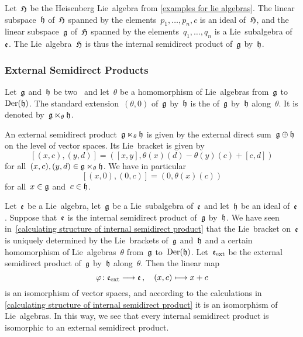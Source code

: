 

\begin{example}
	Let~$\mathfrak{H}$ be the Heisenberg Lie~algebra from \cref{examples for lie algebras}.
	The linear subspace~$\mathfrak{h}$ of~$\mathfrak{H}$ spanned by the elements~$p_1, \dotsc, p_n, c$ is an ideal of~$\mathfrak{H}$, and the linear subspace~$\mathfrak{g}$ of~$\mathfrak{H}$ spanned by the elements~$q_1, \dotsc, q_n$ is a Lie~subalgebra of~$\mathfrak{e}$.
	The Lie~algebra~$\mathfrak{H}$ is thus the internal semidirect product of~$\mathfrak{g}$ by~$\mathfrak{h}$.
\end{example}

\subsubsection{External Semidirect Products}

\begin{definition}
	Let~$\mathfrak{g}$ and~$\mathfrak{h}$ be two~\liealgebras{$\kf$} and let~$\theta$ be a homomorphism of Lie~algebras from~$\mathfrak{g}$ to~$\operatorname{Der}(\mathfrak{h})$.
	The standard extension~$(\theta, 0)$ of~$\mathfrak{g}$ by~$\mathfrak{h}$ is the  of~$\mathfrak{g}$ by~$\mathfrak{h}$ along~$\theta$.
	It is denoted by~$\mathfrak{g} \ltimes_\theta \mathfrak{h}$.
\end{definition}


\begin{remark}
	An external semidirect product~$\mathfrak{g} \ltimes_\theta \mathfrak{h}$ is given by the external direct sum~$\mathfrak{g} \oplus \mathfrak{h}$ on the level of vector spaces.
	Its Lie~bracket is given by
	\[
		[ (x,c), (y,d) ]
		=
		( [x,y], \theta(x)(d) - \theta(y)(c) + [c,d] )
	\]
	for all~$(x,c), (y,d) \in \mathfrak{g} \ltimes_\theta \mathfrak{h}$.
	We have in particular
	\[
		[(x,0), (0,c)]
		=
		( 0, \theta(x)(c) )
	\]
	for all~$x \in \mathfrak{g}$ and~$c \in \mathfrak{h}$.
\end{remark}


\begin{fluff}
	\label{internal semidirect product is also external}
	Let~$\mathfrak{e}$ be a Lie~algebra, let~$\mathfrak{g}$ be a Lie~subalgebra of~$\mathfrak{e}$ and let~$\mathfrak{h}$ be an ideal of~$\mathfrak{e}$.
	Suppose that~$\mathfrak{e}$ is the internal semidirect product of~$\mathfrak{g}$ by~$\mathfrak{h}$.
	We have seen in~\cref{calculating structure of internal semidirect product} that the Lie~bracket on~$\mathfrak{e}$ is uniquely determined by the Lie~brackets of~$\mathfrak{g}$ and~$\mathfrak{h}$ and a certain homomorphism of Lie~algebras~$\theta$ from~$\mathfrak{g}$ to~$\operatorname{Der}(\mathfrak{h})$.
	Let~$\mathfrak{e}_{\mathrm{ext}}$ be the external semidirect product of~$\mathfrak{g}$ by~$\mathfrak{h}$ along~$\theta$.
	Then the linear map
	\[
		\varphi
		\colon
		\elie_{\ext}
		\to
		\elie \,,
		\quad
		(x, c)
		\mapsto
		x + c
	\]
	is an isomorphism of vector spaces, and according to the calculations in \cref{calculating structure of internal semidirect product} it is an isomorphism of Lie~algebras.
	In this way, we see that every internal semidirect product is isomorphic to an external semidirect product.
\end{fluff}


